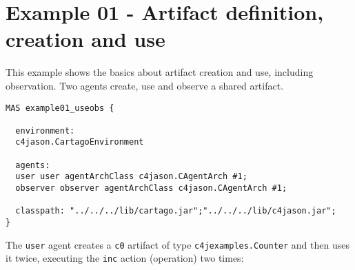 \documentclass[11pt]{report}
\newcommand\code[1]{{\small{\mbox{\texttt{{#1}}}}}}
\newcommand{\cartago}{\mbox{\sf{CArtAgO}}}
\begin{document}
\newpage
\section{Example 01 - Artifact definition, creation and use}

This example shows the basics about artifact creation and use, including observation.
%
Two agents create, use and observe a shared artifact.

{\small{
\begin{verbatim}
MAS example01_useobs {

  environment: 
  c4jason.CartagoEnvironment

  agents:  
  user user agentArchClass c4jason.CAgentArch #1;
  observer observer agentArchClass c4jason.CAgentArch #1;

  classpath: "../../../lib/cartago.jar";"../../../lib/c4jason.jar";    
}
\end{verbatim}}}
%

\noindent The \code{user} agent creates a \code{c0} artifact of type \code{c4jexamples.Counter} and then uses it twice, executing the \code{inc} action (operation) two times:
\end{document}
